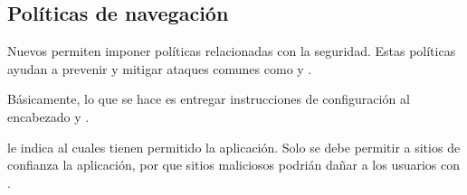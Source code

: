 












\subsection{Políticas de navegación}

Nuevos \browsersINT permiten imponer políticas relacionadas con la seguridad. Estas políticas ayudan a prevenir y mitigar ataques comunes como  \crossSiteScriptingINT y  \clickjackingINT.

Básicamente, lo que se hace es entregar instrucciones de configuración al encabezado \httpNAME \httpHeaderXFMINT y \httpHeaderCSPINT.

\httpHeaderXFMINT le indica al \browserINT cuales \websitesINT tienen permitido \renderCPT la aplicación. Solo se debe permitir a sitios de confianza \frameCPT la aplicación, por que sitios maliciosos podrián dañar a los usuarios con \clickjackingINT \cite{online_javascript_info_clickjacking_frame_options}.

